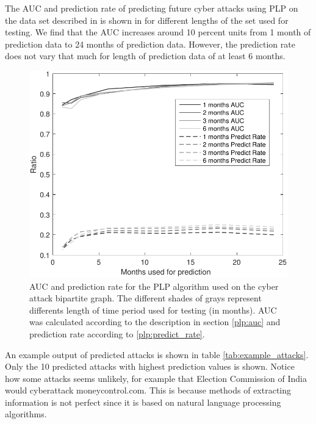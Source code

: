 The AUC and prediction rate of predicting future cyber attacks using PLP on the data set described in  is shown in  for different lengths of the set used for testing. We find that the AUC increases around 10 percent units from 1 month of prediction data to 24 months of prediction data. However, the prediction rate does not vary that much for length of prediction data of at least 6 months.

\begin{figure}[!ht]
\centering
\includegraphics[scale=0.9]{images/auc_plp_result.pdf}
\caption{\label{fig:plp_auc} AUC and prediction rate for the PLP algorithm used on the cyber attack bipartite graph. The different shades of grays represent differents length of time period used for testing (in months). AUC was calculated according to the description in section \ref{plp:auc} and prediction rate according to \ref{plp:predict_rate}.}
\end{figure}

An example output of predicted attacks is shown in table \ref{tab:example_attacks}. Only the 10 predicted attacks with highest prediction values is shown. Notice how some attacks seems unlikely, for example that Election Commission of India would cyberattack moneycontrol.com. This is because methods of extracting information is not perfect since it is based on natural language processing algorithms. 

